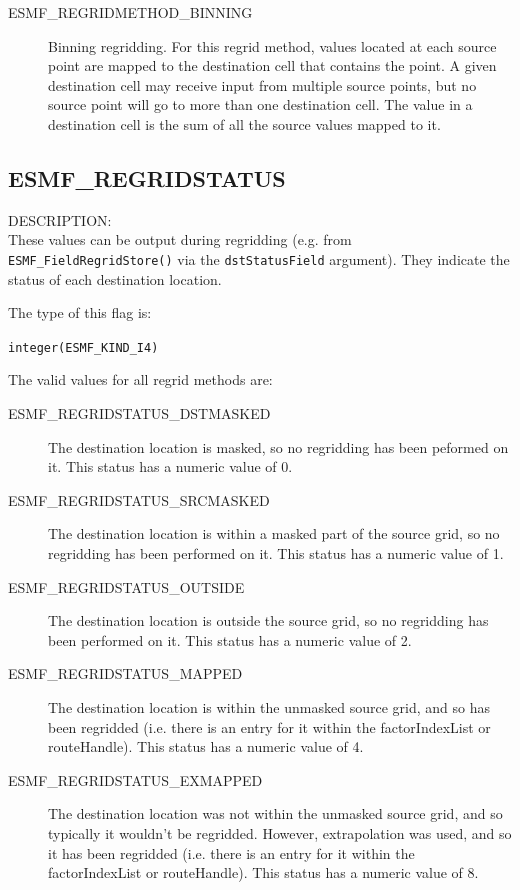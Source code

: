 \begin{description}
\item [ESMF\_REGRIDMETHOD\_BINNING]
  Binning regridding. For this regrid method, values located at each source point are mapped to the destination cell that contains the point. A given destination cell
  may receive input from multiple source points, but no source point will go to more than one destination cell. The value in a destination cell is the sum of all the source values
  mapped to it. 
\end{description}


\subsection{ESMF\_REGRIDSTATUS}
\label{opt:regridstatus}

{\sf DESCRIPTION:\\}  
 These values can be output during regridding (e.g. from {\tt ESMF\_FieldRegridStore()} via the {\tt dstStatusField} argument). They indicate the status of each destination location.

The type of this flag is:

{\tt integer(ESMF\_KIND\_I4)}

The valid values for all regrid methods are:
\begin{description}
\item [ESMF\_REGRIDSTATUS\_DSTMASKED] The destination location is masked, so no regridding has been peformed on it. This status has a numeric value of 0.
\item [ESMF\_REGRIDSTATUS\_SRCMASKED] The destination location is within a masked part of the source grid, so no regridding has been performed on it. This status has a numeric value of 1.
\item [ESMF\_REGRIDSTATUS\_OUTSIDE] The destination location is outside the source grid, so no regridding has been performed on it. This status has a numeric value of 2.
\item [ESMF\_REGRIDSTATUS\_MAPPED] The destination location is within the unmasked source grid, and so has been regridded (i.e. there is an entry for it within the factorIndexList or routeHandle). This status has a numeric value of 4. 
\item [ESMF\_REGRIDSTATUS\_EXMAPPED] The destination location was not within the unmasked source grid, and so typically it wouldn't be regridded. However, extrapolation was used, and so it has been regridded (i.e. there is an entry for it within the factorIndexList or routeHandle). This status has a numeric value of 8.
\end{description}

